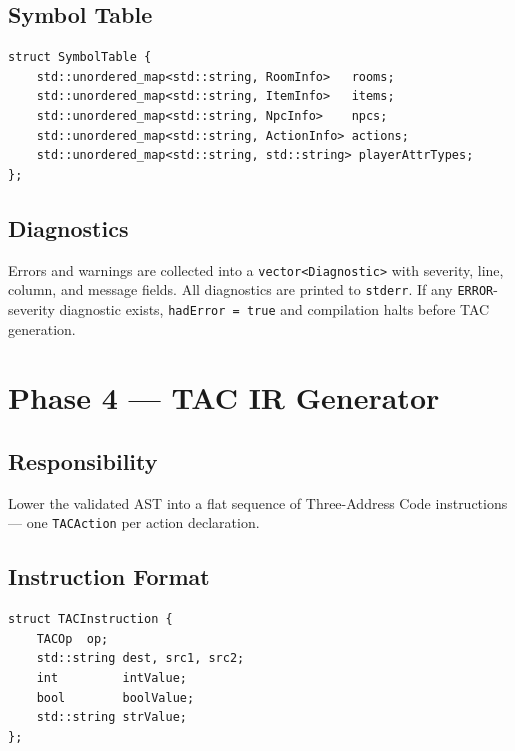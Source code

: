 \documentclass[12pt, a4paper]{article}
\begin{document}
\subsection{Symbol Table}

\begin{lstlisting}[style=cpp, caption={SymbolTable structure}]
struct SymbolTable {
    std::unordered_map<std::string, RoomInfo>   rooms;
    std::unordered_map<std::string, ItemInfo>   items;
    std::unordered_map<std::string, NpcInfo>    npcs;
    std::unordered_map<std::string, ActionInfo> actions;
    std::unordered_map<std::string, std::string> playerAttrTypes;
};
\end{lstlisting}

\subsection{Diagnostics}

Errors and warnings are collected into a \texttt{vector\textless Diagnostic\textgreater}
with severity, line, column, and message fields.
All diagnostics are printed to \texttt{stderr}.
If any \texttt{ERROR}-severity diagnostic exists, \texttt{hadError = true}
and compilation halts before TAC generation.

\section{Phase 4 --- TAC IR Generator}

\subsection{Responsibility}
Lower the validated AST into a flat sequence of Three-Address Code instructions
--- one \texttt{TACAction} per action declaration.

\subsection{Instruction Format}

\begin{lstlisting}[style=cpp, caption={TAC instruction struct}]
struct TACInstruction {
    TACOp  op;
    std::string dest, src1, src2;
    int         intValue;
    bool        boolValue;
    std::string strValue;
};
\end{lstlisting}
\end{document}
